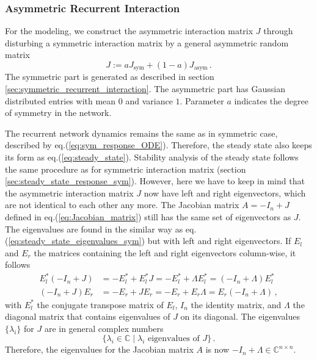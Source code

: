\documentclass[11pt]{article}
\begin{document}
{	 
	\subsubsection{Asymmetric Recurrent Interaction} \label{sec:asym_recurrent_network}
	For the modeling, we construct the asymmetric interaction matrix $J$ through disturbing a symmetric interaction matrix by a general asymmetric random matrix
		\begin{equation} \label{eq:asym_interaction_matrix}
			J := a J_{\text{sym}} + (1-a) J_{\text{asym}} \, .
		\end{equation}
	The symmetric part is generated as described in section \ref{sec:symmetric_recurrent_interaction}. The asymmetric part has Gaussian distributed entries with mean $0$ and variance $1$. Parameter $a$ indicates the degree of symmetry in the network. 
	
	The recurrent network dynamics remains the same as in symmetric case, described by eq.(\ref{eq:sym_response_ODE}). Therefore, the steady state also keeps its form as eq.(\ref{eq:steady_state}). Stability analysis of the steady state follows the same procedure as for symmetric interaction matrix (section \ref{sec:steady_state_response_sym}). However, here we have to keep in mind that the asymmetric interaction matrix $J$ now have left and right eigenvectors, which are not identical to each other any more. The Jacobian matrix $A = -I_n + J$ defined in eq.(\ref{eq:Jacobian_matrix}) still has the same set of eigenvectors as $J$. The eigenvalues are found in the similar way as eq.(\ref{eq:steady_state_eigenvalues_sym}) but with left and right eigenvectors. If $E_l$ and $E_r$ the matrices containing the left and right eigenvectors column-wise, it follows
		\begin{equation}
			\begin{split}
				E_l^*(-I_n + J) &= - E_l^* + E_l^* J =  - E_l^* + \Lambda E_l^* = (-I_n + \Lambda) E_l^* \\
				(-I_n + J) E_r &= - E_r + J E_r = -E_r + E_r \Lambda = E_r (-I_n + \Lambda) \, , 
			\end{split}
		\end{equation}	
	with $E_l^*$ the conjugate transpose matrix of $E_l$, $I_n$ the identity matrix, and $\Lambda$ the diagonal matrix that contains eigenvalues of $J$ on its diagonal. The eigenvalues $\{\lambda_i\}$ for $J$ are in general complex numbers
	\begin{equation}
		\{\lambda_i \in \mathbb{C} \mid \lambda_i \text{ eigenvalues of $J$}\} \, .
	\end{equation}
	Therefore, the eigenvalues for the Jacobian matrix $A$ is now $-I_n + \Lambda \in \mathbb{C}^{n \times n}$. 
	
}
\end{document}
